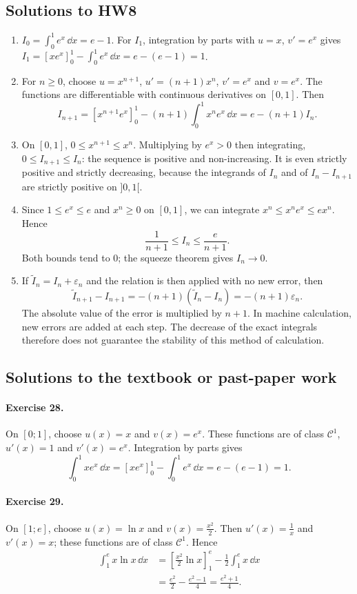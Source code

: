 \subsection{Solutions to HW8}\begin{enumerate}
\item $I_0=\int_0^1e^x\,\dd x=e-1$. For $I_1$, integration by parts with $u=x$, $v'=e^x$ gives $I_1=[xe^x]_0^1-\int_0^1e^x\,\dd x=e-(e-1)=1$.
\item For $n\ge0$, choose $u=x^{n+1}$, $u'=(n+1)x^n$, $v'=e^x$ and $v=e^x$. The functions are differentiable with continuous derivatives on $[0,1]$. Then
\[I_{n+1}=[x^{n+1}e^x]_0^1-(n+1)\int_0^1x^ne^x\,\dd x=e-(n+1)I_n.\]
\item On $[0,1]$, $0\le x^{n+1}\le x^n$. Multiplying by $e^x>0$ then integrating, $0\le I_{n+1}\le I_n$: the sequence is positive and non-increasing. It is even strictly positive and strictly decreasing, because the integrands of $I_n$ and of $I_n-I_{n+1}$ are strictly positive on $]0,1[$.
\item Since $1\le e^x\le e$ and $x^n\ge0$ on $[0,1]$, we can integrate $x^n\le x^ne^x\le ex^n$. Hence
\[\frac1{n+1}\le I_n\le\frac e{n+1}.\]
Both bounds tend to $0$; the squeeze theorem gives $I_n\to0$.
\item If $\widetilde I_n=I_n+\varepsilon_n$ and the relation is then applied with no new error, then
\[\widetilde I_{n+1}-I_{n+1}=-(n+1)(\widetilde I_n-I_n)=-(n+1)\varepsilon_n.\]
The absolute value of the error is multiplied by $n+1$. In machine calculation, new errors are added at each step. The decrease of the exact integrals therefore does not guarantee the stability of this method of calculation.
\end{enumerate}

\subsection{Solutions to the textbook or past-paper work}\paragraph{Exercise 28.} On $[0;1]$, choose $u(x)=x$ and $v(x)=e^x$. These functions are of class $\mathcal C^1$, $u'(x)=1$ and $v'(x)=e^x$. Integration by parts gives
\[\int_0^1xe^x\,\dd x=[xe^x]_0^1-\int_0^1e^x\,\dd x=e-(e-1)=1.\]
\paragraph{Exercise 29.} On $[1;e]$, choose $u(x)=\ln x$ and $v(x)=\frac{x^2}2$. Then $u'(x)=\frac1x$ and $v'(x)=x$; these functions are of class $\mathcal C^1$. Hence
\[\begin{aligned}\int_1^e x\ln x\,\dd x&=\left[\frac{x^2}2\ln x\right]_1^e-\frac12\int_1^e x\,\dd x\\&=\frac{e^2}2-\frac{e^2-1}4=\frac{e^2+1}4.\end{aligned}\]

\fi
